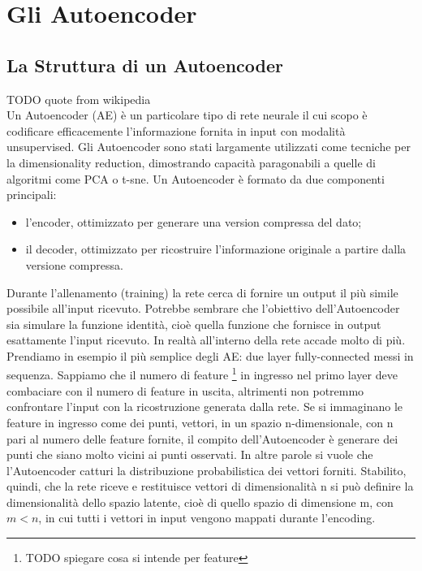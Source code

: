 
\chapter{Gli Autoencoder}

\section{La Struttura di un Autoencoder}
TODO quote from wikipedia\\
Un Autoencoder (AE) è un particolare tipo di rete neurale il cui scopo è codificare efficacemente l'informazione fornita in input con modalità unsupervised.
Gli Autoencoder sono stati largamente utilizzati come tecniche per la dimensionality reduction, dimostrando capacità paragonabili a quelle di algoritmi come PCA o t-sne.
Un Autoencoder è formato da due componenti principali:
\begin{itemize}
    \item l'encoder, ottimizzato per generare una version compressa del dato;
    \item il decoder, ottimizzato per ricostruire l'informazione originale a partire dalla versione compressa.
\end{itemize}
Durante l'allenamento (training) la rete cerca di fornire un output il più simile possibile all'input ricevuto.
Potrebbe sembrare che l'obiettivo %
dell'Autoencoder sia simulare la funzione identità, cioè quella funzione che fornisce in output esattamente l'input ricevuto.
In realtà all'interno della rete accade molto di più.
Prendiamo in esempio il più semplice degli AE: due layer fully-connected messi in sequenza.
Sappiamo che il numero di feature \footnote{TODO spiegare cosa si intende per feature} in ingresso nel primo layer deve combaciare con il numero di feature in uscita, altrimenti non potremmo confrontare l'input con la ricostruzione generata dalla rete.
Se si immaginano le feature in ingresso come dei punti, vettori, in un spazio n-dimensionale, con n pari al numero delle feature fornite, il compito dell'Autoencoder è generare dei punti che siano molto vicini ai punti osservati.
In altre parole si vuole che l'Autoencoder catturi la distribuzione probabilistica dei vettori forniti.
Stabilito, quindi, che la rete riceve e restituisce vettori di dimensionalità n si può definire la dimensionalità dello spazio latente, cioè di quello spazio di dimensione m, con $m < n$, in cui tutti i  vettori in input vengono mappati durante l'encoding.
